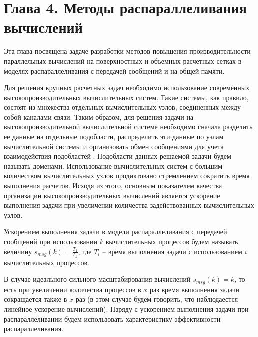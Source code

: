 \newpage
\section*{Глава 4. Методы распараллеливания вычислений} %
\addtocounter{section}{1}                                                    %
\setcounter{subsection}{0}
\setcounter{figure}{0}
\setcounter{equation}{0}
\setcounter{table}{0}
\setcounter{theorem}{0}
\setcounter{lemma}{0}
\setcounter{definition}{0}

Эта глава посвящена задаче разработки методов повышения производительности параллельных вычислений на поверхностных и объемных расчетных сетках в моделях распараллеливания с передачей сообщений и на общей памяти.

Для решения крупных расчетных задач необходимо использование современных высокопроизводительных вычислительных систем.
Такие системы, как правило, состоят из множества отдельных вычислительных узлов, соединенных между собой каналами связи.
Таким образом, для решения задачи на высокопроизводительной вычислительной системе необходимо сначала разделить ее данные на отдельные подобласти, распределить эти данные по узлам вычислительной системы и организовать обмен сообщениями для учета взаимодействия подобластей \cite{GOST57700HPC}.
Подобласти данных решаемой задачи будем называть доменами.
Использование вычислительных систем с большим количеством вычислительных узлов продиктовано стремлением сократить время выполнения расчетов.
Исходя из этого, основным показателем качества организации высокопроизводительных вычислений является ускорение выполнения задачи при увеличении количества задействованных вычислительных узлов.

\begin{definition}
Ускорением выполнения задачи в модели распараллеливания с передачей сообщений при использовании $k$ вычислительных процессов будем называть величину $s_{msg}(k) = \frac{T_1}{T_k}$, где $T_i$ -- время выполнения задачи с использованием $i$ вычислительных процессов. 
\end{definition}

В случае идеального сильного масштабирования вычислений $s_{msg}(k) = k$, то есть при увеличении количества процессов в $x$ раз время выполнения задачи сокращается также в $x$ раз (в этом случае будем говорить, что наблюдаестся линейное ускорение вычислений).
Наряду с ускорением выполнения задачи при распараллеливании будем использовать характеристику эффективности распараллеливания.

